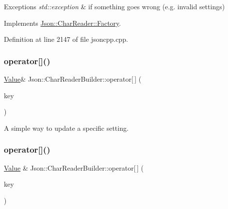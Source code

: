 \begin{DoxyExceptions}{Exceptions}
{\em std\+::exception} & if something goes wrong (e.\+g. invalid settings) \\
\hline
\end{DoxyExceptions}


Implements \hyperlink{class_json_1_1_char_reader_1_1_factory_a4c5862a1ffd432372dbe65cf59de98c4}{Json\+::\+Char\+Reader\+::\+Factory}.



Definition at line 2147 of file jsoncpp.\+cpp.

\hypertarget{class_json_1_1_char_reader_builder_a1ee7bdbd6a7cd27c3c4b34a375204e21}{}\label{class_json_1_1_char_reader_builder_a1ee7bdbd6a7cd27c3c4b34a375204e21} 
\subsubsection{\texorpdfstring{operator[]()}{operator[]()}\hspace{0.1cm}{\footnotesize\ttfamily [1/2]}}
{\footnotesize\ttfamily \hyperlink{class_json_1_1_value}{Value}\& Json\+::\+Char\+Reader\+Builder\+::operator\mbox{[}$\,$\mbox{]} (\begin{DoxyParamCaption}\item[{\hyperlink{config_8h_a1e723f95759de062585bc4a8fd3fa4be}{J\+S\+O\+N\+C\+P\+P\+\_\+\+S\+T\+R\+I\+NG}}]{key }\end{DoxyParamCaption})}

A simple way to update a specific setting. \hypertarget{class_json_1_1_char_reader_builder_a84b35ef443340c06c0aa7b47851d8d86}{}\label{class_json_1_1_char_reader_builder_a84b35ef443340c06c0aa7b47851d8d86} 
\subsubsection{\texorpdfstring{operator[]()}{operator[]()}\hspace{0.1cm}{\footnotesize\ttfamily [2/2]}}
{\footnotesize\ttfamily \hyperlink{class_json_1_1_value}{Value} \& Json\+::\+Char\+Reader\+Builder\+::operator\mbox{[}$\,$\mbox{]} (\begin{DoxyParamCaption}\item[{\hyperlink{config_8h_a1e723f95759de062585bc4a8fd3fa4be}{J\+S\+O\+N\+C\+P\+P\+\_\+\+S\+T\+R\+I\+NG}}]{key }\end{DoxyParamCaption})}

